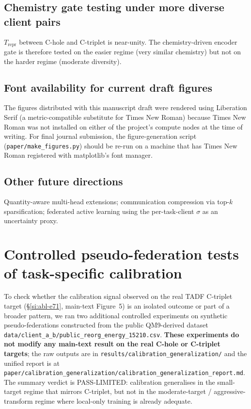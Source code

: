 \documentclass[11pt,a4paper]{article}
\begin{document}
\subsection{Chemistry gate testing under more diverse client pairs}
$T_{\mathrm{repr}}$ between C-hole and C-triplet is near-unity. The chemistry-driven encoder gate is therefore tested on the easier regime (very similar chemistry) but not on the harder regime (moderate diversity).

\subsection{Font availability for current draft figures}
The figures distributed with this manuscript draft were rendered using Liberation Serif (a metric-compatible substitute for Times New Roman) because Times New Roman was not installed on either of the project's compute nodes at the time of writing. For final journal submission, the figure-generation script (\texttt{paper/make\_figures.py}) should be re-run on a machine that has Times New Roman registered with matplotlib's font manager.

\subsection{Other future directions}
Quantity-aware multi-head extensions; communication compression via top-$k$ sparsification; federated active learning using the per-task-client $\sigma$ as an uncertainty proxy.

\section{Controlled pseudo-federation tests of task-specific calibration}\label{si:calgen}

To check whether the calibration signal observed on the real TADF C-triplet target (\S\ref{si:abl-e71}, main-text Figure~5) is an isolated outcome or part of a broader pattern, we ran two additional controlled experiments on synthetic pseudo-federations constructed from the public QM9-derived dataset \texttt{data/client\_a\_b/public\_reorg\_energy\_15210.csv}. \textbf{These experiments do not modify any main-text result on the real C-hole or C-triplet targets}; the raw outputs are in \texttt{results/calibration\_generalization/} and the unified report is at \texttt{paper/calibration\_generalization/calibration\_generalization\_report.md}. The summary verdict is PASS-LIMITED: calibration generalises in the small-target regime that mirrors C-triplet, but not in the moderate-target / aggressive-transform regime where local-only training is already adequate.
\end{document}
